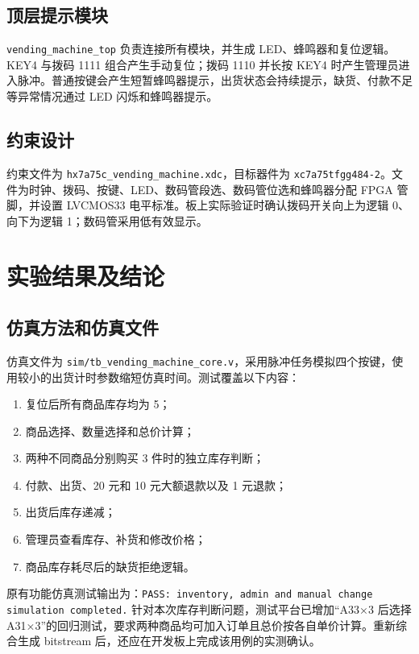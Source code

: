 \documentclass[UTF8,a4paper,12pt]{ctexart}
\begin{document}
\subsection{顶层提示模块}

\texttt{vending\_machine\_top} 负责连接所有模块，并生成 LED、蜂鸣器和复位逻辑。KEY4 与拨码 1111 组合产生手动复位；拨码 1110 并长按 KEY4 时产生管理员进入脉冲。普通按键会产生短暂蜂鸣器提示，出货状态会持续提示，缺货、付款不足等异常情况通过 LED 闪烁和蜂鸣器提示。

\subsection{约束设计}

约束文件为 \texttt{hx7a75c\_vending\_machine.xdc}，目标器件为 \texttt{xc7a75tfgg484-2}。文件为时钟、拨码、按键、LED、数码管段选、数码管位选和蜂鸣器分配 FPGA 管脚，并设置 LVCMOS33 电平标准。板上实际验证时确认拨码开关向上为逻辑 0、向下为逻辑 1；数码管采用低有效显示。

\section{实验结果及结论}

\subsection{仿真方法和仿真文件}

仿真文件为 \texttt{sim/tb\_vending\_machine\_core.v}，采用脉冲任务模拟四个按键，使用较小的出货计时参数缩短仿真时间。测试覆盖以下内容：

\begin{enumerate}
  \item 复位后所有商品库存均为 5；
  \item 商品选择、数量选择和总价计算；
  \item 两种不同商品分别购买 3 件时的独立库存判断；
  \item 付款、出货、20 元和 10 元大额退款以及 1 元退款；
  \item 出货后库存递减；
  \item 管理员查看库存、补货和修改价格；
  \item 商品库存耗尽后的缺货拒绝逻辑。
\end{enumerate}

原有功能仿真测试输出为：\texttt{PASS: inventory, admin and manual change simulation completed.} 针对本次库存判断问题，测试平台已增加“A33×3 后选择 A31×3”的回归测试，要求两种商品均可加入订单且总价按各自单价计算。重新综合生成 bitstream 后，还应在开发板上完成该用例的实测确认。
\end{document}
